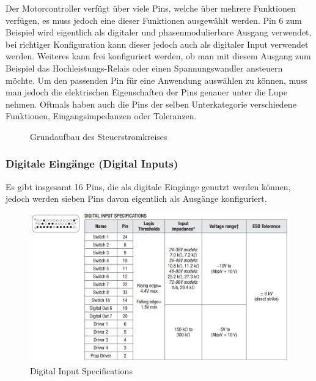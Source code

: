 \vspace{5mm}

Der Motorcontroller verfügt über viele Pins, welche über mehrere Funktionen verfügen, es muss jedoch eine dieser Funktionen ausgewählt werden. Pin 6 zum Beispiel wird eigentlich als digitaler und phasenmodulierbare Ausgang verwendet, bei richtiger Konfiguration kann dieser jedoch auch als digitaler Input verwendet werden. Weiteres kann frei konfiguriert werden, ob man mit diesem Ausgang zum Beispiel das Hochleistungs-Relais oder einen Spannungswandler ansteuern möchte. Um den passenden Pin für eine Anwendung auswählen zu können, muss man jedoch die elektrischen Eigenschaften der Pins genauer unter die Lupe nehmen. Oftmals haben auch die Pins der selben Unterkategorie verschiedene Funktionen, Eingangsimpedanzen oder Toleranzen. 

\begin{figure}[H]
	\begin{center}
		\caption{Grundaufbau des Steuerstromkreises}
	\end{center}
\end{figure}

\newpage



\subsubsection{Digitale Eingänge (Digital Inputs)}
Es gibt insgesamt 16 Pins, die als digitale Eingänge genutzt werden können, jedoch werden sieben Pins davon eigentlich als Ausgänge konfiguriert. 

\begin{figure}[H]
	\begin{center}
		\includegraphics[width=\textwidth]{figures/antrieb/Digital_Input_Specifications.png}
		\caption{Digital Input Specifications}
	\end{center}
\end{figure}




